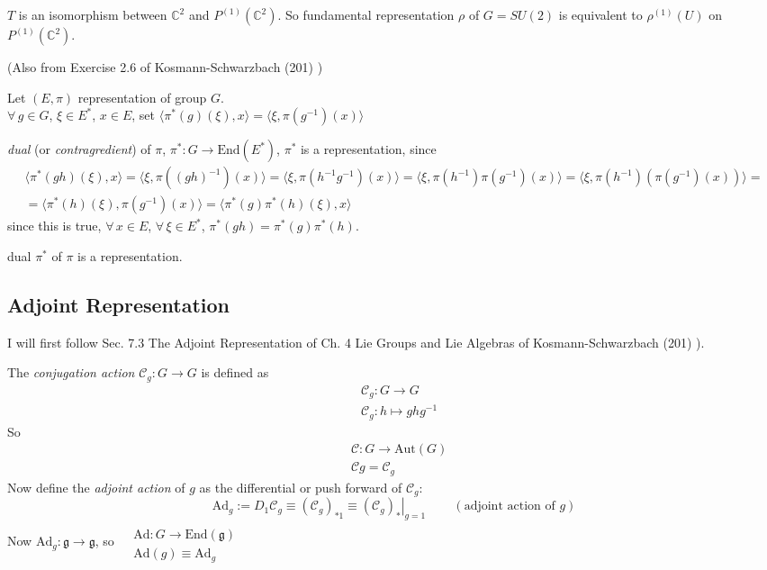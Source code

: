 \documentclass[10pt]{amsart}
\newcommand{\exercisehead}[1]
  { \smallskip
   \noindent{\small\bf Exercise #1.}
  }
\begin{document}
\begin{multicols*}{2}
$T$ is an isomorphism between $\mathbb{C}^2$ and $P^{(1)}(\mathbb{C}^2)$.  So fundamental representation $\rho$ of $G=SU(2)$ is equivalent to $\rho^{(1)}(U)$ on $P^{(1)}(\mathbb{C}^2)$.  

\exercisehead{23}\cite{JBaezJMuniain1994} (Also from Exercise 2.6 of Kosmann-Schwarzbach (201) \cite{YKosmann-Schwarzbach2010})

Let $(E,\pi)$ representation of group $G$.  \\
$\forall \, g \in G$, $\xi \in E^*$, $x\in E$, set $\langle \pi^*(g)(\xi), x \rangle = \langle \xi, \pi(g^{-1})(x) \rangle$

\emph{dual} (or \emph{contragredient}) of $\pi$, $\pi^*:G \to \text{End}(E^*)$, $\pi^*$ is a representation, since
\[
\begin{gathered}
\langle \pi^*(gh)(\xi),x\rangle = \langle \xi, \pi((gh)^{-1})(x) \rangle = \langle \xi, \pi(h^{-1}g^{-1})(x) \rangle = \langle \xi, \pi(h^{-1}) \pi(g^{-1})(x) \rangle = \langle \xi, \pi(h^{-1}) (\pi(g^{-1})(x)) \rangle =  \\
= \langle \pi^*(h)(\xi), \pi(g^{-1})(x) \rangle = \langle \pi^*(g)\pi^*(h)(\xi), x \rangle
\end{gathered}
\]
since this is true, $\forall \, x \in E$, $\forall \, \xi \in E^*$, $\pi^*(gh) = \pi^*(g)\pi^*(h)$.  

dual $\pi^*$ of $\pi$ is a representation.  


\subsection{Adjoint Representation}

I will first follow Sec. 7.3 The Adjoint Representation of Ch. 4 Lie Groups and Lie Algebras of Kosmann-Schwarzbach (201) \cite{YKosmann-Schwarzbach2010}).  

The \emph{conjugation action} $\mathcal{C}_g:G\to G$ is defined as 
\[
\begin{aligned}
& \mathcal{C}_g:G\to G \\
&  \mathcal{C}_g: h \mapsto ghg^{-1}
\end{aligned}
\]
So 
\[
\begin{aligned}
& \mathcal{C}: G \to \text{Aut}(G) \\ 
& \mathcal{C}g = \mathcal{C}_g
\end{aligned}
\]
Now define the \emph{adjoint action} of $g$ as the differential or push forward of $\mathcal{C}_g$:
\[
\text{Ad}_g := D_1 \mathcal{C}_g \equiv (\mathcal{C}_g)_{*1} \equiv \left. (\mathcal{C}_g )_* \right|_{g=1}  \qquad \, (\text{adjoint action of $g$})
\]
Now $\text{Ad}_g: \mathfrak{g} \to \mathfrak{g}$, so $\begin{aligned} & \quad \\
& \text{Ad}:G \to \text{End}(\mathfrak{g}) \\
& \text{Ad}(g) \equiv \text{Ad}_g \end{aligned}$


\end{multicols*}
\end{document}
